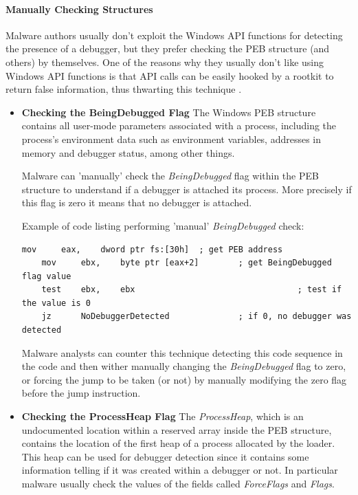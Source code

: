\documentclass[pdfa%
,cucitura%
]{toptesi}
\begin{document}
\paragraph{Manually Checking Structures}
Malware authors usually don't exploit the Windows API functions for detecting the presence of a debugger, but they prefer checking the PEB structure (and others) by themselves. One of the reasons why they usually don't like using Windows API functions is that API calls can be easily hooked by a rootkit to return false information, thus thwarting this technique \cite{SikorskiPMA}.

\begin{itemize}
	\item \textbf{Checking the BeingDebugged Flag}
	The Windows PEB structure contains all user-mode parameters associated with a process, including the process's environment data such as environment variables, addresses in memory and debugger status, among other things.
	
	Malware can 'manually' check the \textit{BeingDebugged} flag within the PEB structure to understand if a debugger is attached its process. More precisely if this flag is zero it means that no debugger is attached.
	
	Example of code listing performing 'manual' \textit{BeingDebugged} check:
	\begin{lstlisting}[caption={BeingDebugged manual check}, label=code:BeingDebuggedManual, language={[x86masm]Assembler}, style=mystyle]
	mov		eax,	dword ptr fs:[30h]	; get PEB address
	mov		ebx,	byte ptr [eax+2]		; get BeingDebugged flag value
	test	ebx,	ebx									; test if the value is 0
	jz		NoDebuggerDetected				; if 0, no debugger was detected
	\end{lstlisting}
	
	Malware analysts can counter this technique detecting this code sequence in the code and then wither manually changing the \textit{BeingDebugged} flag to zero, or forcing the jump to be taken (or not) by manually modifying the zero flag before the jump instruction.
	
	\item \textbf{Checking the ProcessHeap Flag} 
	The \textit{ProcessHeap}, which is an undocumented location within a reserved array inside the PEB structure, contains the location of the first heap of a process allocated by the loader. This heap can be used for debugger detection since it contains some information telling if it was created within a debugger or not. In particular malware usually check the values of the fields called \textit{ForceFlags} and \textit{Flags}.
	

\end{itemize}
\end{document}

